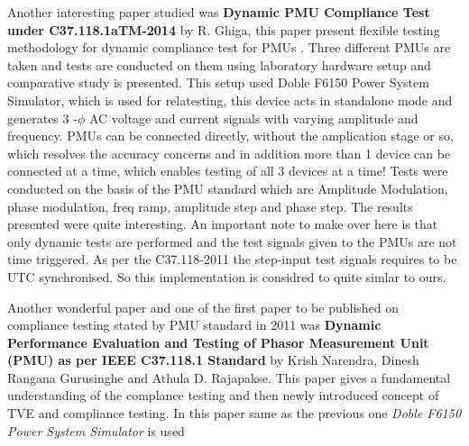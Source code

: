 Another interesting paper studied was \textbf{Dynamic PMU Compliance Test under C37.118.1aTM-2014} by R. Ghiga, this paper present flexible testing methodology for dynamic compliance test for PMUs \cite{Paper:ghiga}. Three different PMUs are taken and tests are conducted on them using laboratory hardware setup and comparative study is presented. This setup used Doble F6150 Power System Simulator, which is used for relatesting, this device acts in standalone mode and generates 3 -$\phi$ AC voltage and current signals with varying amplitude and frequency. PMUs can be connected directly, without the amplication stage or so, which resolves the accuracy concerns and in addition more than 1 device can be connected at a time, which enables testing of all 3 devices at a time! Tests were conducted on the basis of the PMU standard which are Amplitude Modulation, phase modulation, freq ramp, amplitude step and phase step. The results presented were quite interesting. An important note to make over here is that only dynamic tests are performed and the test signals given to the PMUs are not time triggered. As per the C37.118-2011 the step-input test signals requires to be UTC synchronised. So this implementation is considred to quite simlar to ours.

Another wonderful paper and one of the first paper to be published on compliance testing stated by PMU standard in 2011 was \textbf{Dynamic Performance Evaluation and Testing of Phasor Measurement Unit (PMU) as per IEEE C37.118.1 Standard} by Krish Narendra, Dinesh Rangana Gurusinghe and Athula D. Rajapakse. This paper gives a fundamental understanding of the complance testing and then newly introduced concept of TVE and compliance testing. In this paper same as the previous one \textit{Doble F6150 Power System Simulator} is used